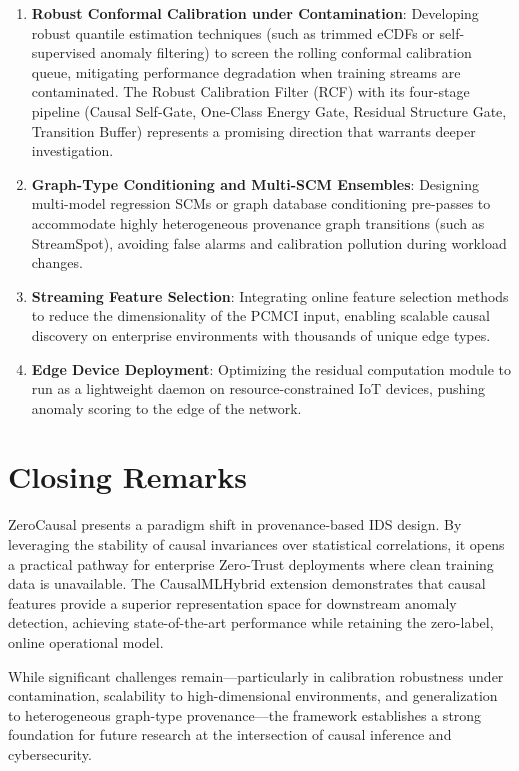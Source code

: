 \begin{enumerate}
\item \textbf{Robust Conformal Calibration under Contamination}: Developing robust quantile estimation techniques (such as trimmed eCDFs or self-supervised anomaly filtering) to screen the rolling conformal calibration queue, mitigating performance degradation when training streams are contaminated. The Robust Calibration Filter (RCF) with its four-stage pipeline (Causal Self-Gate, One-Class Energy Gate, Residual Structure Gate, Transition Buffer) represents a promising direction that warrants deeper investigation.

\item \textbf{Graph-Type Conditioning and Multi-SCM Ensembles}: Designing multi-model regression SCMs or graph database conditioning pre-passes to accommodate highly heterogeneous provenance graph transitions (such as StreamSpot), avoiding false alarms and calibration pollution during workload changes.

\item \textbf{Streaming Feature Selection}: Integrating online feature selection methods to reduce the dimensionality of the PCMCI input, enabling scalable causal discovery on enterprise environments with thousands of unique edge types.

\item \textbf{Edge Device Deployment}: Optimizing the residual computation module to run as a lightweight daemon on resource-constrained IoT devices, pushing anomaly scoring to the edge of the network.
\end{enumerate}

\section{Closing Remarks}

ZeroCausal presents a paradigm shift in provenance-based IDS design. By leveraging the stability of causal invariances over statistical correlations, it opens a practical pathway for enterprise Zero-Trust deployments where clean training data is unavailable. The CausalMLHybrid extension demonstrates that causal features provide a superior representation space for downstream anomaly detection, achieving state-of-the-art performance while retaining the zero-label, online operational model.

While significant challenges remain---particularly in calibration robustness under contamination, scalability to high-dimensional environments, and generalization to heterogeneous graph-type provenance---the framework establishes a strong foundation for future research at the intersection of causal inference and cybersecurity.
